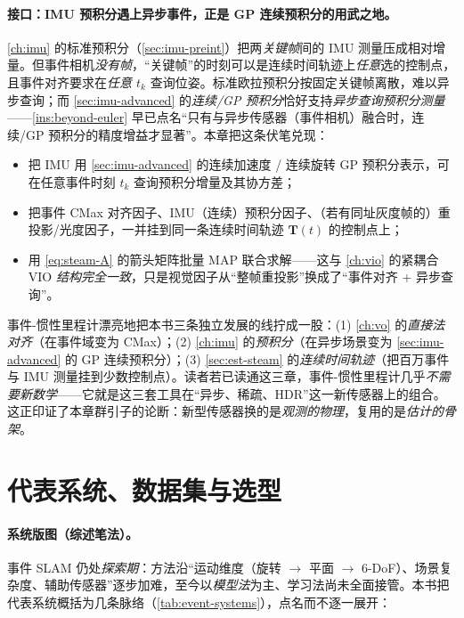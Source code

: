 \paragraph{接口：IMU 预积分遇上异步事件，正是 GP 连续预积分的用武之地。}
\cref{ch:imu} 的标准预积分（\cref{sec:imu-preint}）把两\emph{关键帧}间的 IMU 测量压成相对增量。但事件相机\emph{没有帧}，“关键帧”的时刻可以是连续时间轨迹上\emph{任意}选的控制点，且事件对齐要求在\emph{任意 $t_k$} 查询位姿。标准欧拉预积分按固定关键帧离散，难以异步查询；而 \cref{sec:imu-advanced} 的\emph{连续/GP 预积分}恰好支持\emph{异步查询预积分测量}——\cref{ins:beyond-euler} 早已点名“只有与异步传感器（事件相机）融合时，连续/GP 预积分的精度增益才显著”。本章把这条伏笔兑现：

\begin{itemize}
  \item 把 IMU 用 \cref{sec:imu-advanced} 的连续加速度 / 连续旋转 GP 预积分表示，可在任意事件时刻 $t_k$ 查询预积分增量及其协方差；
  \item 把事件 CMax 对齐因子、IMU（连续）预积分因子、（若有同址灰度帧的）重投影/光度因子，一并挂到同一条连续时间轨迹 $\mathbf T(t)$ 的控制点上；
  \item 用 \cref{eq:steam-A} 的箭头矩阵批量 MAP 联合求解——这与 \cref{ch:vio} 的紧耦合 VIO \emph{结构完全一致}，只是视觉因子从“整帧重投影”换成了“事件对齐 + 异步查询”。
\end{itemize}

\begin{insight}[事件-惯性融合是本书三条线的汇流]
事件-惯性里程计漂亮地把本书三条独立发展的线拧成一股：(1) \cref{ch:vo} 的\emph{直接法对齐}（在事件域变为 CMax）；(2) \cref{ch:imu} 的\emph{预积分}（在异步场景变为 \cref{sec:imu-advanced} 的 GP 连续预积分）；(3) \cref{sec:est-steam} 的\emph{连续时间轨迹}（把百万事件与 IMU 测量挂到少数控制点）。读者若已读通这三章，事件-惯性里程计几乎\emph{不需要新数学}——它就是这三套工具在“异步、稀疏、HDR”这一新传感器上的组合。这正印证了本章群引子的论断：新型传感器换的是\emph{观测的物理}，复用的是\emph{估计的骨架}。
\end{insight}

\section{代表系统、数据集与选型}
\label{sec:event-systems}

\paragraph{系统版图（综述笔法）。}
事件 SLAM 仍处\emph{探索期}：方法沿“运动维度（旋转 $\to$ 平面 $\to$ 6-DoF）、场景复杂度、辅助传感器”逐步加难，至今以\emph{模型法}为主、学习法尚未全面接管\cite{gallego2022eventsurvey}。本书把代表系统概括为几条脉络（\cref{tab:event-systems}），点名而不逐一展开：

